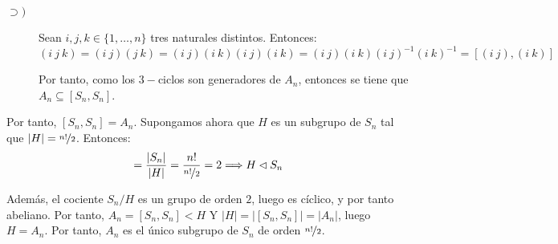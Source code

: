 \begin{ejercicio}
\begin{enumerate}
\begin{description}
            \item[$\supset)$] Sean $i,j,k\in \{1,\ldots,n\}$ tres naturales distintos. Entonces:
            \begin{equation*}
                (i\ j\ k) = (i\ j)(j\ k) = (i\ j)(i\ k)(i\ j)(i\ k)
                = (i\ j)(i\ k)(i\ j)^{-1}(i\ k)^{-1} = [(i\ j),(i\ k)]
            \end{equation*}

            Por tanto, como los $3-$ciclos son generadores de $A_n$, entonces se tiene que $A_n\subseteq [S_n,S_n]$.
        \end{description}

        Por tanto, $[S_n,S_n]=A_n$. Supongamos ahora que $H$ es un subgrupo de $S_n$ tal que $|H|=\nicefrac{n!}{2}$. Entonces:
        \begin{equation*}
            [S_n : H] = \frac{|S_n|}{|H|} = \frac{n!}{\nicefrac{n!}{2}} = 2
            \Longrightarrow H\lhd S_n
        \end{equation*}

        Además, el cociente $S_n/H$ es un grupo de orden $2$, luego es cíclico, y por tanto abeliano. Por tanto, $A_n=[S_n,S_n]<H$ Y $|H|=|[S_n,S_n]|=|A_n|$, luego $H=A_n$. Por tanto, $A_n$ es el único subgrupo de $S_n$ de orden $\nicefrac{n!}{2}$.
    \end{enumerate}
\end{ejercicio}
